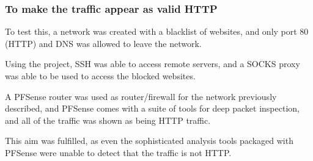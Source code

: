 \subsubsection*{To make the traffic appear as valid HTTP}
To test this, a network was created with a blacklist of websites, and only port 80 (HTTP) and DNS was allowed to leave the network.\par
Using the project, SSH was able to access remote servers, and a SOCKS proxy was able to be used to access the blocked websites.\par
A PFSense router was used as router/firewall for the network previously described, and PFSense comes with a suite of tools for deep packet inspection, and all of the traffic was shown as being HTTP traffic.\par
This aim was fulfilled, as even the sophisticated analysis tools packaged with PFSense were unable to detect that the traffic is not HTTP\@.
